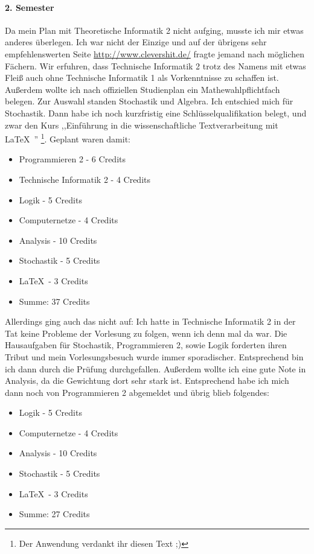 \paragraph{2. Semester}
Da mein Plan mit Theoretische Informatik 2 nicht aufging, musste ich
mir etwas anderes überlegen. Ich war nicht der Einzige und auf der
übrigens sehr empfehlenswerten Seite \url{http://www.clevershit.de/}
fragte jemand nach möglichen Fächern. Wir erfuhren, dass Technische
Informatik 2 trotz des Namens mit etwas Fleiß auch ohne Technische
Informatik 1 als Vorkenntnisse zu schaffen ist. Außerdem wollte ich
nach offiziellen Studienplan ein Mathewahlpflichtfach belegen. Zur
Auswahl standen Stochastik und Algebra. Ich entschied mich für
Stochastik. Dann habe ich  noch kurzfristig eine
Schlüsselqualifikation belegt, und zwar den Kurs ,,Einführung in die
wissenschaftliche Textverarbeitung mit \LaTeX\ '' \footnote{Der
  Anwendung verdankt ihr diesen Text ;)}.%
Geplant waren damit:
\begin{itemize}
\item Programmieren 2 - 6 Credits
\item Technische Informatik 2 - 4 Credits
\item Logik  - 5 Credits 
\item Computernetze - 4 Credits
\item Analysis - 10 Credits
\item Stochastik - 5 Credits
\item \LaTeX\ - 3 Credits
\item Summe: 37 Credits
\end{itemize}
Allerdings ging auch das nicht auf: Ich hatte in Technische Informatik
2 in der Tat keine Probleme der Vorlesung zu folgen, wenn ich denn mal
da war. Die Hausaufgaben für Stochastik, Programmieren 2, sowie Logik
forderten ihren Tribut und mein Vorlesungsbesuch wurde immer
sporadischer. Entsprechend bin ich dann durch die Prüfung
durchgefallen. Außerdem wollte ich eine gute Note in Analysis, da die
Gewichtung dort sehr stark ist. Entsprechend habe ich mich dann noch
von Programmieren 2 abgemeldet und übrig blieb folgendes:
\begin{itemize}
\item Logik  - 5 Credits 
\item Computernetze - 4 Credits
\item Analysis - 10 Credits
\item Stochastik - 5 Credits
\item \LaTeX\ - 3 Credits
\item Summe: 27 Credits
\end{itemize}

